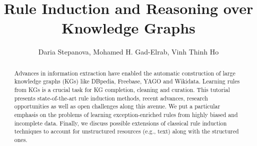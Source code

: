 \documentclass[runningheads]{llncs}
\begin{document}
%
\title{Rule Induction and Reasoning over\\ Knowledge Graphs}
%
%

\author{
Daria Stepanova, Mohamed H. Gad-Elrab, Vinh Thinh Ho
}		

%
%
%
\maketitle              %
%
\begin{abstract}
Advances in information extraction have enabled the automatic
construction of large knowledge graphs (KGs) like DBpedia, Freebase, YAGO
and Wikidata. Learning rules from KGs is a crucial task for KG completion,
cleaning and curation. This tutorial presents state-of-the-art rule
induction methods, recent advances, research opportunities as well as open
challenges along this avenue. We put a particular emphasis on the problems
of learning exception-enriched rules from highly biased and incomplete
data. Finally, we discuss possible extensions of classical rule induction
techniques to account for unstructured resources (e.g., text) along with
the structured ones.
\end{abstract}









%


%
%
 
 
%
\end{document}
